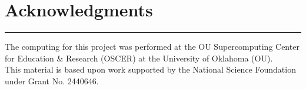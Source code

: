 \cleardoublepage
{}\chapter*{Acknowledgments}

\begin{center}
\noindent\rule{\textwidth}{0.4pt}
\end{center}
The computing for this project was performed at the OU Supercomputing Center for Education \& Research (OSCER) at the University of Oklahoma (OU).\vspace{10pt}\\
This material is based upon work supported by the National Science Foundation under Grant No. 2440646.